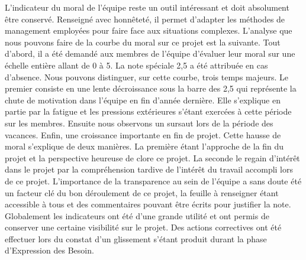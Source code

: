 L’indicateur du moral de l’équipe reste un outil intéressant et doit absolument être conservé. Renseigné avec honnêteté, il permet d’adapter les méthodes de management employées pour faire face aux situations complexes. L’analyse que nous pouvons faire de la courbe du moral sur ce projet est la suivante. Tout d’abord, il a été demandé aux membres de l’équipe d’évaluer leur moral sur une échelle entière allant de 0 à 5. La note spéciale 2,5 a été attribuée en cas d’absence. Nous  pouvons distinguer, sur cette courbe, trois temps majeurs. Le premier consiste en une lente décroissance sous la barre des 2,5 qui représente la chute de motivation dans l’équipe en fin d’année dernière. Elle s’explique en partie par la fatigue et les pressions extérieures s’étant exercées à cette période sur les membres. Ensuite nous observons un sursaut lors de la période des vacances. Enfin, une croissance importante en fin de projet. Cette hausse de moral s’explique de deux manières. La première étant l’approche de la fin du projet et la perspective heureuse de clore ce projet. La seconde le regain d’intérêt dans le projet par la compréhension tardive de l’intérêt du travail accompli lors de ce projet. L’importance de la transparence au sein de l’équipe a sans doute été un facteur clé du bon déroulement de ce projet, la feuille à renseigner étant accessible à tous et des commentaires pouvant être écrits pour justifier la note. \\

Globalement les indicateurs ont été d’une grande utilité et ont permis de conserver une certaine visibilité sur le projet. Des actions correctives ont été effectuer lors du constat d’un glissement s’étant produit durant la phase d’Expression des Besoin. \\